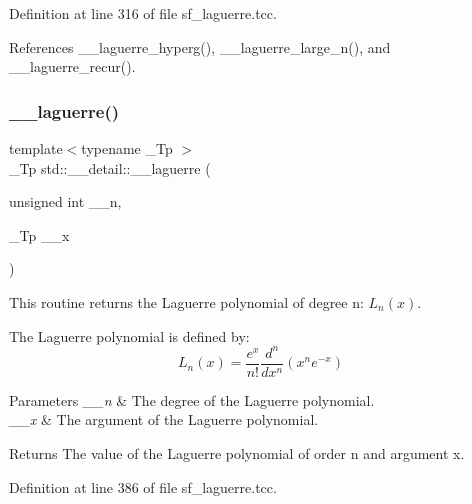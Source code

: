 Definition at line 316 of file sf\+\_\+laguerre.\+tcc.



References \+\_\+\+\_\+laguerre\+\_\+hyperg(), \+\_\+\+\_\+laguerre\+\_\+large\+\_\+n(), and \+\_\+\+\_\+laguerre\+\_\+recur().

\mbox{\label{namespacestd_1_1____detail_aa714c4983a3cb7d9d18e0c2c5a8f6826}} 
\subsubsection{\texorpdfstring{\+\_\+\+\_\+laguerre()}{\_\_laguerre()}\hspace{0.1cm}{\footnotesize\ttfamily [2/2]}}
{\footnotesize\ttfamily template$<$typename \+\_\+\+Tp $>$ \\
\+\_\+\+Tp std\+::\+\_\+\+\_\+detail\+::\+\_\+\+\_\+laguerre (\begin{DoxyParamCaption}\item[{unsigned int}]{\+\_\+\+\_\+n,  }\item[{\+\_\+\+Tp}]{\+\_\+\+\_\+x }\end{DoxyParamCaption})}



This routine returns the Laguerre polynomial of degree n\+: $ L_n(x) $. 

The Laguerre polynomial is defined by\+: \[ L_n(x) = \frac{e^x}{n!} \frac{d^n}{dx^n} (x^ne^{-x}) \]


\begin{DoxyParams}{Parameters}
{\em \+\_\+\+\_\+n} & The degree of the Laguerre polynomial. \\
\hline
{\em \+\_\+\+\_\+x} & The argument of the Laguerre polynomial. \\
\hline
\end{DoxyParams}
\begin{DoxyReturn}{Returns}
The value of the Laguerre polynomial of order n and argument x. 
\end{DoxyReturn}


Definition at line 386 of file sf\+\_\+laguerre.\+tcc.

\mbox{\label{namespacestd_1_1____detail_a7908be328a4546d77802076196ae4396}} 
